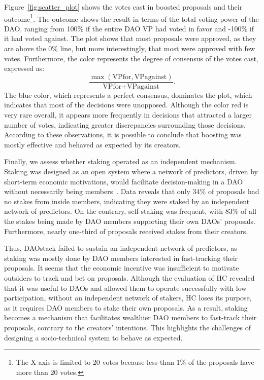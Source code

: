 \documentclass[10pt,lineno]{wlpeerj}
\begin{document}
Figure~\ref{fig:scatter_plot} shows the votes cast in boosted proposals and their outcome\footnote{The X-axis is limited to 20 votes because less than 1\% of the proposals have more than 20 votes.}. The outcome shows the result in terms of the total voting power of the DAO, ranging from 100\% if the entire DAO VP had voted in favor and -100\% if it had voted against. The plot shows that most proposals were approved, as they are above the 0\% line, but more interestingly, that most were approved with few votes. Furthermore, the color represents the degree of consensus of the votes cast, expressed as:
$$
\frac{\max\left(\text{VPfor},\text{VPagainst}\right)}{\text{VPfor} + \text{VPagainst}}.
$$
The blue color, which represents a perfect consensus, dominates the plot, which indicates that most of the decisions were unopposed. Although the color red is very rare overall, it appears more frequently in decisions that attracted a larger number of votes, indicating greater discrepancies surrounding those decisions. According to these observations, it is possible to conclude that boosting was mostly effective and behaved as expected by its creators.

Finally, we assess whether staking operated as an independent mechanism. Staking was designed as an open system where a network of predictors, driven by short-term economic motivations, would facilitate decision-making in a DAO without necessarily being members~\citep{Field_2018}. Data reveals that only 34\% of proposals had no stakes from inside members, indicating they were staked by an independent network of predictors. On the contrary, self-staking was frequent, with 83\% of all the stakes being made by DAO members supporting their own DAOs’ proposals. Furthermore, nearly one-third of proposals received stakes from their creators.

Thus, DAOstack failed to sustain an independent network of predictors, as staking was mostly done by DAO members interested in fast-tracking their proposals. It seems that the economic incentive was insufficient to motivate outsiders to track and bet on proposals. Although the evaluation of HC revealed that it was useful to DAOs and allowed them to operate successfully with low participation, without an independent network of stakers, HC loses its purpose, as it requires DAO members to stake their own proposals. As a result, staking becomes a mechanism that facilitates wealthier DAO members to fast-track their proposals, contrary to the creators’ intentions. This highlights the challenges of designing a socio-technical system to behave as expected.
\end{document}
